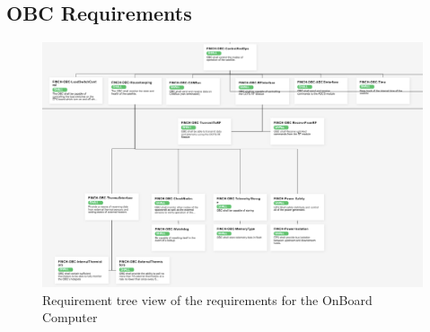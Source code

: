 \documentclass[12pt,a4paper]{article}
\begin{document}
    \subsection{OBC Requirements}
    \begin{figure}[H]
        \centering
        \includegraphics[width=0.98\linewidth]{../figures/OBC_req_tree.png}
        \caption{Requirement tree view of the requirements for the OnBoard Computer}
        \label{fig:OBC_req_tree}
    \end{figure}
    
\end{document}

